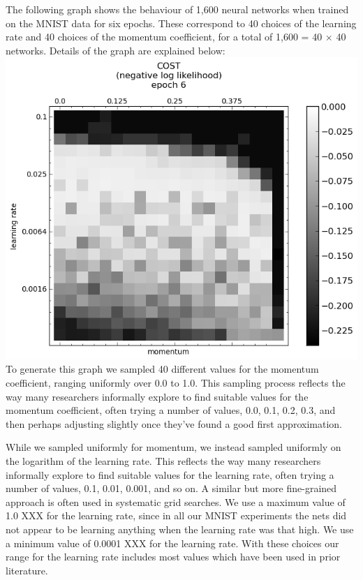 \documentclass[10pt]{article}
\begin{document}
The following graph shows the behaviour of 1,600 neural networks when
trained on the MNIST data for six epochs. These correspond to 40
choices of the learning rate and 40 choices of the momentum
coefficient, for a total of 1,600 = 40 $\times$ 40 networks.  Details
of the graph are explained below:
%
\includegraphics[scale=0.5]{plots/detailed/LF-20R10R-20T10-MNIST-6.png}
%
%
%
%
%
To generate this graph we sampled 40 different values for the momentum
coefficient, ranging uniformly over 0.0 to 1.0.  This sampling process
reflects the way many researchers informally explore to find suitable
values for the momentum coefficient, often trying a number of values,
0.0, 0.1, 0.2, 0.3, and then perhaps adjusting slightly once they've
found a good first approximation.

While we sampled uniformly for momentum, we instead sampled uniformly
on the logarithm of the learning rate.  This reflects the way many
researchers informally explore to find suitable values for the
learning rate, often trying a number of values, 0.1, 0.01, 0.001, and
so on.  A similar but more fine-grained approach is often used in
systematic grid searches.  We use a maximum value of 1.0 XXX for the
learning rate, since in all our MNIST experiments the nets did not
appear to be learning anything when the learning rate was that high.
We use a minimum value of 0.0001 XXX for the learning rate.  With
these choices our range for the learning rate includes most values
which have been used in prior literature.
\end{document}
